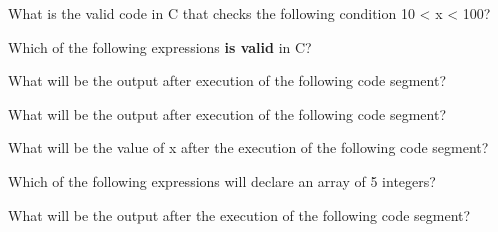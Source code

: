 \documentclass[11pt]{examdesign}
\begin{document}


\begin{multiplechoice}[title={},suppressprefix=yes,rearrange=yes]
\begin{question}
What is the valid code in C that checks the following condition 10 < x <
100?
\end{question}

\begin{question}
Which of the following expressions \textbf{is valid} in C?
\end{question}

\begin{question}
What will be the output after execution of the following code segment?
\end{question}

\begin{question}
What will be the output after execution of the following code segment?
\end{question}

\begin{question}
What will be the value of x after the execution of the following code segment?
\end{question}
  
\begin{question}
Which of the following expressions will declare an array of 5 integers?
\end{question}
  
\begin{question}
What will be the output after the execution of the following code segment?
\end{question}
  

\end{multiplechoice}
\end{document}
